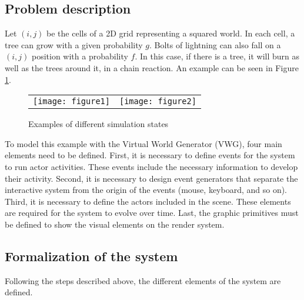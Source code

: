 \documentclass[10pt,journal,letterpaper,compsoc]{IEEEtran}
\begin{document}
\subsection{Problem description
\label{sec:description_problem}}

Let $(i, j)$ be the cells of a 2D grid representing a squared world. In each cell, a tree can grow
with a given probability $g$. Bolts of lightning can also fall on a $(i, j)$ position
with a probability $f$. In this case, if there is a tree, it will burn as well as
the trees around it, in a chain reaction. An example can be seen in Figure \ref{fig:ejemplo}.

\begin{figure}[htb]
    \centering
    \begin{tabular}{cc}
        \texttt{[image: figure1]} &
        \texttt{[image: figure2]}
    \end{tabular}
    \caption{\label{fig:ejemplo} Examples of different simulation states}
\end{figure}

To model this example with the Virtual World Generator (VWG), four main elements need to be defined.
First, it is necessary to define events for the system to run actor activities. These events
include the necessary information to develop their activity. Second, it is necessary to design
event generators that separate the interactive system from the origin of the events (mouse, keyboard, and
so on). Third, it is necessary to define the actors included in the scene. These elements are
required for the system to evolve over time. Last, the graphic primitives must be defined to show
the visual elements on the render system.



\subsection{Formalization of the system
\label{sec:formalization_system_model}}

Following the steps described above, the different elements of the system are defined.

\end{document}
